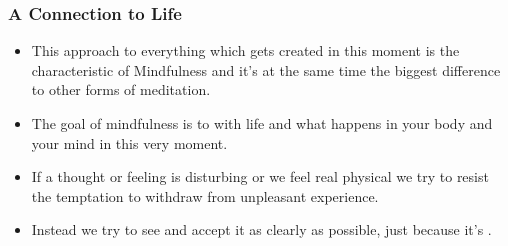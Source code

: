 \begin{frame}
\frametitle{A Connection to Life}
\begin{itemize}
\item This  approach to everything which gets created in this moment is the characteristic of Mindfulness and it's at the same time the biggest difference to other forms of meditation.
\item The goal of mindfulness is to  with life and what happens in your body and your mind in this very moment.
\item If a thought or feeling is disturbing or we feel real physical  we try to resist the temptation to withdraw from unpleasant experience.
\item Instead we try to see and accept it as clearly as possible, just because it's . 
\end{itemize}
\end{frame}

